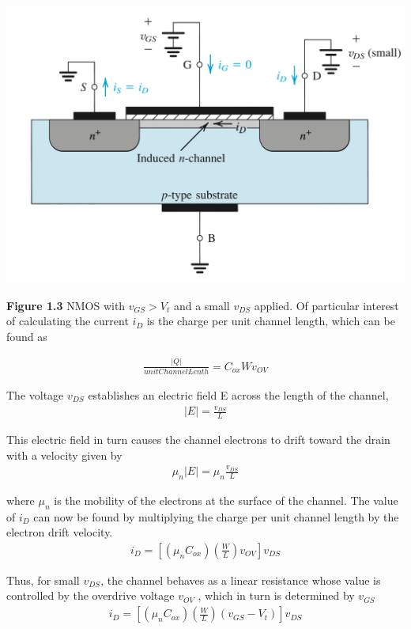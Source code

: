 \documentclass[12pt]{article}
\begin{document}
    \begin{center}
        \centerline{\includegraphics[scale=0.5]{figures/small_vds.png}}
        \textbf{Figure 1.3} NMOS with $v_{GS} > V_t$ and a small $v_{DS}$ applied.
        Of particular interest of calculating the current $i_D$ is the charge per
        unit channel length, which can be found as
    \end{center}
    \begin{align}
        \frac{|Q|}{unitChannelLenth} = C_{ox}Wv_{OV}
    \end{align}

    The voltage $v_{DS}$ establishes an electric field E across the length of the channel,
    \begin{align}
        |E| = \frac{v_{DS}}{L}
    \end{align}

    This electric field in turn causes the channel electrons to drift toward the drain with 
    a velocity given by
    \begin{align}
        \mu_n|E| = \mu_n\frac{v_{DS}}{L}
    \end{align}

    where $\mu_n$ is the mobility of the electrons at the surface of the channel. The value 
    of $i_D$ can now be found by multiplying the charge per unit channel length by the electron
    drift velocity.
    \begin{align}
        i_D = \left[(\mu_nC_{ox})\left(\frac{W}{L}\right)v_{OV}\right]v_{DS}
    \end{align}

    Thus, for small $v_{DS}$, the channel behaves as a linear resistance whose value is controlled 
    by the overdrive voltage $v_{OV}$ , which in turn is determined by $v_{GS}$
    \begin{align}
        i_D = \left[(\mu_nC_{ox})\left(\frac{W}{L}\right)(v_{GS}-V_t)\right]v_{DS}
    \end{align}
\end{document}
